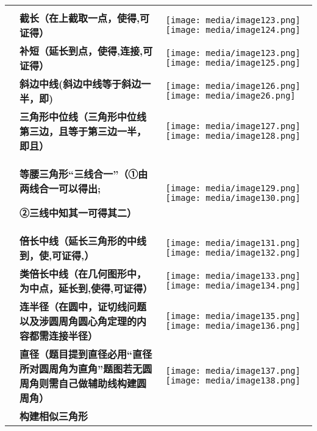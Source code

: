 \documentclass[a4paper,11pt,UTF8]{ctexart}
\begin{document}
\begin{longtable}[]{@{}lll@{}}
\toprule
\endhead
& &\tabularnewline
& \textbf{截长（在上截取一点，使得,可证得）} &
\texttt{[image: media/image123.png]}\texttt{[image: media/image124.png]}\tabularnewline
& \textbf{补短（延长到点，使得,连接,可证得）} &
\texttt{[image: media/image123.png]}\texttt{[image: media/image125.png]}\tabularnewline
& \textbf{斜边中线(斜边中线等于斜边一半，即)} &
\texttt{[image: media/image126.png]}\texttt{[image: media/image26.png]}\tabularnewline
& \textbf{三角形中位线（三角形中位线第三边，且等于第三边一半，即且）} &
\texttt{[image: media/image127.png]}\texttt{[image: media/image128.png]}\tabularnewline
\begin{minipage}[t]{0.30\columnwidth}\raggedright
\strut
\end{minipage} & \begin{minipage}[t]{0.30\columnwidth}\raggedright
\textbf{等腰三角形``三线合一''（①由两线合一可以得出;}

\textbf{②三线中知其一可得其二）}\strut
\end{minipage} & \begin{minipage}[t]{0.30\columnwidth}\raggedright
\texttt{[image: media/image129.png]}\texttt{[image: media/image130.png]}\strut
\end{minipage}\tabularnewline
& \textbf{倍长中线（延长三角形的中线到，使,可证得,）} &
\texttt{[image: media/image131.png]}\texttt{[image: media/image132.png]}\tabularnewline
& \textbf{类倍长中线（在几何图形中，为中点，延长到,使得,可证得）} &
\texttt{[image: media/image133.png]}
\texttt{[image: media/image134.png]}\tabularnewline
&
\textbf{连半径（在圆中，证切线问题以及涉圆周角圆心角定理的内容都需连接半径）}
& \texttt{[image: media/image135.png]}
\texttt{[image: media/image136.png]}\tabularnewline
&
\textbf{直径（题目提到直径必用``直径所对圆周角为直角''题图若无圆周角则需自己做辅助线构建圆周角）}
&
\texttt{[image: media/image137.png]}\texttt{[image: media/image138.png]}\tabularnewline
\begin{minipage}[t]{0.30\columnwidth}\raggedright
\strut
\end{minipage} & \begin{minipage}[t]{0.30\columnwidth}\raggedright
\textbf{构建相似三角形}


\end{minipage}
\end{longtable}
\end{document}
